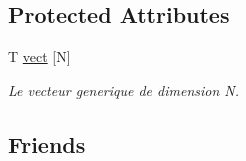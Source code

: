 \subsection*{Protected Attributes}
\begin{DoxyCompactItemize}
\item 
\hypertarget{class_vecteur_a2c2224d33b1b96b4cb75f010d5ec1d97}{T \hyperlink{class_vecteur_a2c2224d33b1b96b4cb75f010d5ec1d97}{vect} \mbox{[}N\mbox{]}}\label{class_vecteur_a2c2224d33b1b96b4cb75f010d5ec1d97}

\begin{DoxyCompactList}\small\item\em Le vecteur generique de dimension {\itshape N}. \end{DoxyCompactList}\end{DoxyCompactItemize}
\subsection*{Friends}
